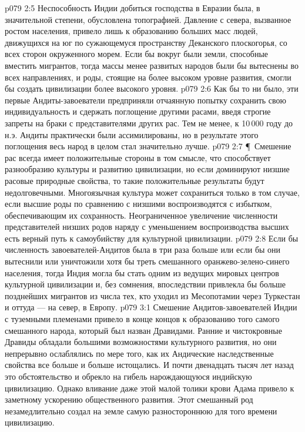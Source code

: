\vs p079 2:5 Неспособность Индии добиться господства в Евразии была, в значительной степени, обусловлена топографией. Давление с севера, вызванное ростом населения, привело лишь к образованию больших масс людей, движущихся на юг по сужающемуся пространству Деканского плоскогорья, со всех сторон окруженного морем. Если бы вокруг были земли, способные вместить мигрантов, тогда массы менее развитых народов были бы вытеснены во всех направлениях, и роды, стоящие на более высоком уровне развития, смогли бы создать цивилизации более высокого уровня.
\vs p079 2:6 Как бы то ни было, эти первые Андиты\hyp{}завоеватели предприняли отчаянную попытку сохранить свою индивидуальность и сдержать поглощение другими расами, введя строгие запреты на браки с представителями других рас. Тем не менее, к 10\,000 году до н.э. Андиты практически были ассимилированы, но в результате этого поглощения весь народ в целом стал значительно лучше.
\vs p079 2:7 \P\ Смешение рас всегда имеет положительные стороны в том смысле, что способствует разнообразию культуры и развитию цивилизации, но если доминируют низшие расовые природные свойства, то такие положительные результаты будут недолговечными. Многоязычная культура может сохраниться только в том случае, если высшие роды по сравнению с низшими воспроизводятся с избытком, обеспечивающим их сохранность. Неограниченное увеличение численности представителей низших родов наряду с уменьшением воспроизводства высших есть верный путь к самоубийству для культурной цивилизации.
\vs p079 2:8 Если бы численность завоевателей\hyp{}Андитов была в три раза больше или если бы они вытеснили или уничтожили хотя бы треть смешанного оранжево\hyp{}зелено\hyp{}синего населения, тогда Индия могла бы стать одним из ведущих мировых центров культурной цивилизации и, без сомнения, впоследствии привлекла бы больше позднейших мигрантов из числа тех, кто уходил из Месопотамии через Туркестан и оттуда --- на север, в Европу.
\vs p079 3:1 Смешение Андитов\hyp{}завоевателей Индии с туземными племенами привело в конце концов к образованию того самого смешанного народа, который был назван Дравидами. Ранние и чистокровные Дравиды обладали большими возможностями культурного развития, но они непрерывно ослаблялись по мере того, как их Андические наследственные свойства все больше и больше истощались. И почти двенадцать тысяч лет назад это обстоятельство и обрекло на гибель нарождающуюся индийскую цивилизацию. Однако вливание даже этой малой толики крови Адама привело к заметному ускорению общественного развития. Этот смешанный род незамедлительно создал на земле самую разностороннюю для того времени цивилизацию.
